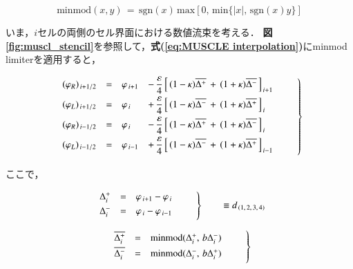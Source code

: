 \begin{equation}
\mathrm{minmod}(x,y) \,=\, \mathrm{sgn}(x) \, \mathrm{max}[0,\,\mathrm{min}\{ |x|,\, \mathrm{sgn}(x)y\} ]
\label{eq:minmod limiter}
\end{equation}

いま，$i$セルの両側のセル界面における数値流束を考える．
\textbf{図\ref{fig:muscl_stencil}}を参照して，\textbf{式(\ref{eq:MUSCLE interpolation})}にminmod limiterを適用すると，

\begin{equation}
\left.
\begin{array}{llll}
\vspace{1mm}
(\varphi_R)_{\,i+1/2} & = & \varphi_{\,i+1} & \displaystyle{ - \, \frac{\varepsilon}{4} \left[ \, (1-\kappa) \overline{\Delta^+}  \,+\, (1+\kappa) \overline{\Delta^-}\,\right]_{\,i+1} } \\
\vspace{1mm}
(\varphi_L)_{\,i+1/2} & = & \varphi_{\,i} & \displaystyle{ + \, \frac{\varepsilon}{4} \left[ \, (1-\kappa) \overline{\Delta^-}  \,+\, (1+\kappa) \overline{\Delta^+}\,\right]_{\,i} } \\
\vspace{1mm}
(\varphi_R)_{\,i-1/2} & = & \varphi_{\,i} & \displaystyle{ - \, \frac{\varepsilon}{4} \left[ \, (1-\kappa) \overline{\Delta^+}  \,+\, (1+\kappa) \overline{\Delta^-}\,\right]_{\,i} } \\
\vspace{1mm}
(\varphi_L)_{\,i-1/2} & = & \varphi_{\,i-1} & \displaystyle{ + \, \frac{\varepsilon}{4} \left[ \, (1-\kappa) \overline{\Delta^-}  \,+\, (1+\kappa) \overline{\Delta^+}\,\right]_{\,i-1} } \\
\end{array} \qquad \right\}
\label{eq:MUSCL minmod}
\end{equation}

\noindent ここで，

\[
\left.
\begin{array}{lll}
\vspace{1mm}
\Delta^+_i & = & \varphi_{\,i+1} - \varphi_{\,i}\\
\vspace{1mm}
\Delta^-_i & = & \varphi_{\,i} - \varphi_{\,i-1}\\ 
\end{array}
\qquad \right\} \qquad \equiv d_{\,(1,\,2,\,3,\,4)}
\]

\[
\left.
\begin{array}{lll}
\vspace{1mm}
\overline{\Delta^+_i} & = & \mathrm{minmod} ( \Delta^+_i, \,b\Delta^-_i )\\
\vspace{1mm}
\overline{\Delta^-_i} & = & \mathrm{minmod} ( \Delta^-_i, \,b\Delta^+_i )\\ 
\end{array}
\qquad \right\}
\]

